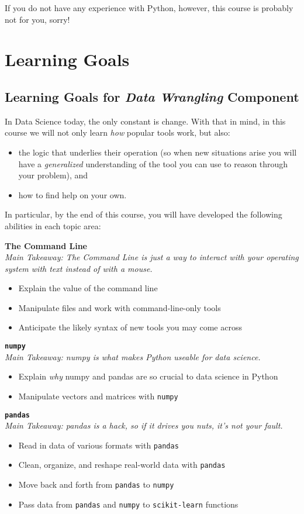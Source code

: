 \documentclass[12pt]{article}
\begin{document}
If you do not have any experience with Python, however, this course is probably not for you, sorry!

\section{Learning Goals}


\subsection{Learning Goals for \emph{Data Wrangling} Component}

In Data Science today, the only constant is change. With that in mind, in this course we will not only learn \emph{how} popular tools work, but also:
\begin{itemize}
	\item the logic that underlies their operation (so when new situations arise you will have a \emph{generalized} understanding of the tool you can use to reason through your problem), and
	\item how to find help on your own.
\end{itemize}

In particular, by the end of this course, you will have developed the following abilities in each topic area:

\textbf{The Command Line}\\
\emph{Main Takeaway: The Command Line is just a way to interact with your operating system with text instead of with a mouse.}
\begin{itemize}
	\item Explain the value of the command line
	\item Manipulate files and work with command-line-only tools
	\item Anticipate the likely syntax of new tools you may come across
\end{itemize}

\textbf{\texttt{numpy}}\\
\emph{Main Takeaway: numpy is what makes Python useable for data science.}
\begin{itemize}
	\item Explain \emph{why} numpy and pandas are so crucial to data science in Python
	\item Manipulate vectors and matrices with \texttt{numpy}
\end{itemize}

\textbf{\texttt{pandas}}\\
\emph{Main Takeaway: pandas is a hack, so if it drives you nuts, it's not your fault.}
\begin{itemize}
	\item Read in data of various formats with \texttt{pandas}
	\item Clean, organize, and reshape real-world data with \texttt{pandas}
	\item Move back and forth from \texttt{pandas} to \texttt{numpy}
	\item Pass data from \texttt{pandas} and \texttt{numpy} to \texttt{scikit-learn} functions
\end{itemize}
\end{document}
